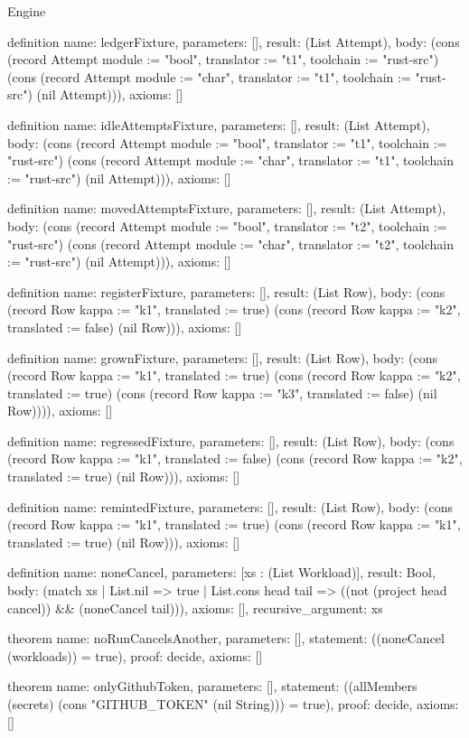 \begin{lexlean}{Engine}
\begin{semanticmodule}
definition{
  name: ledgerFixture,
  parameters: [],
  result: (List Attempt),
  body: (cons (record Attempt {module := "bool", translator := "t1", toolchain := "rust-src"}) (cons (record Attempt {module := "char", translator := "t1", toolchain := "rust-src"}) (nil Attempt))),
  axioms: []
}

definition{
  name: idleAttemptsFixture,
  parameters: [],
  result: (List Attempt),
  body: (cons (record Attempt {module := "bool", translator := "t1", toolchain := "rust-src"}) (cons (record Attempt {module := "char", translator := "t1", toolchain := "rust-src"}) (nil Attempt))),
  axioms: []
}

definition{
  name: movedAttemptsFixture,
  parameters: [],
  result: (List Attempt),
  body: (cons (record Attempt {module := "bool", translator := "t2", toolchain := "rust-src"}) (cons (record Attempt {module := "char", translator := "t2", toolchain := "rust-src"}) (nil Attempt))),
  axioms: []
}

definition{
  name: registerFixture,
  parameters: [],
  result: (List Row),
  body: (cons (record Row {kappa := "k1", translated := true}) (cons (record Row {kappa := "k2", translated := false}) (nil Row))),
  axioms: []
}

definition{
  name: grownFixture,
  parameters: [],
  result: (List Row),
  body: (cons (record Row {kappa := "k1", translated := true}) (cons (record Row {kappa := "k2", translated := true}) (cons (record Row {kappa := "k3", translated := false}) (nil Row)))),
  axioms: []
}

definition{
  name: regressedFixture,
  parameters: [],
  result: (List Row),
  body: (cons (record Row {kappa := "k1", translated := false}) (cons (record Row {kappa := "k2", translated := true}) (nil Row))),
  axioms: []
}

definition{
  name: remintedFixture,
  parameters: [],
  result: (List Row),
  body: (cons (record Row {kappa := "k1", translated := true}) (cons (record Row {kappa := "k1", translated := true}) (nil Row))),
  axioms: []
}

definition{
  name: noneCancel,
  parameters: [xs : (List Workload)],
  result: Bool,
  body: (match xs
    | List.nil => true
    | List.cons head tail => ((not (project head cancel)) && (noneCancel tail))),
  axioms: [],
  recursive_argument: xs
}

theorem{
  name: noRunCancelsAnother,
  parameters: [],
  statement: ((noneCancel (workloads)) = true),
  proof: decide{},
  axioms: []
}

theorem{
  name: onlyGithubToken,
  parameters: [],
  statement: ((allMembers (secrets) (cons "GITHUB_TOKEN" (nil String))) = true),
  proof: decide{},
  axioms: []
}


\end{semanticmodule}
\end{lexlean}
